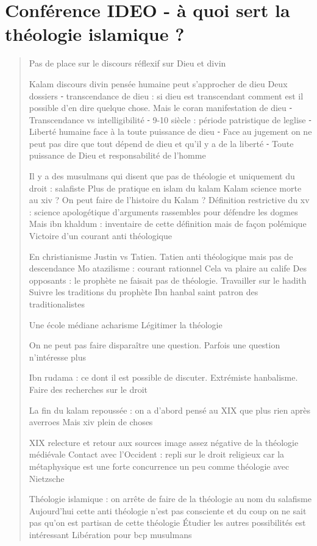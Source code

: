 \section{Conférence IDEO -  à quoi sert la théologie islamique ?}
\begin{quote}

Pas de place sur le discours réflexif sur Dieu et divin
 
Kalam discours divin pensée humaine peut s’approcher de dieu
Deux dossiers
	⁃	transcendance de dieu : si dieu est transcendant comment est il possible d’en dire quelque chose. Mais le coran manifestation de dieu
	⁃	Transcendance vs intelligibilité 
	⁃	9-10 siècle : période patristique de leglise
	⁃	Liberté humaine face à la toute puissance de dieu
	⁃	Face au jugement on ne peut pas dire que tout dépend de dieu et qu’il y a de la liberté 
	⁃	Toute puissance de Dieu et responsabilité de l’homme

Il y a des musulmans qui disent que pas de théologie et uniquement du droit : salafiste
Plus de pratique en islam du kalam
Kalam science morte au xiv ? On peut faire de l’histoire du Kalam ?
Définition restrictive du xv : science apologétique d’arguments rassembles pour défendre les dogmes
Mais ibn khaldum : inventaire de cette définition mais de façon polémique 
Victoire d’un courant anti théologique

En christianisme Justin vs Tatien. Tatien anti théologique mais pas de descendance
Mo atazilisme : courant rationnel
Cela va plaire au calife
Des opposants : le prophète ne faisait pas de théologie. Travailler sur le hadith 
Suivre les traditions du prophète
Ibn hanbal saint patron des traditionalistes

Une école médiane acharisme 
Légitimer la théologie

On ne peut pas faire disparaître une question. Parfois une question n’intéresse plus

Ibn rudama : ce dont il est possible de discuter. Extrémiste hanbalisme. Faire des recherches sur le droit

La fin du kalam repoussée : on a d’abord pensé au XIX que plus rien après averroes 
Mais xiv plein de choses

XIX relecture et retour aux sources image assez négative de la théologie médiévale
Contact avec l’Occident : repli sur le droit religieux car la métaphysique est une forte concurrence un peu comme théologie avec Nietzsche

Théologie islamique : on arrête de faire de la théologie au nom du salafisme
Aujourd’hui cette anti théologie n’est pas consciente et du coup on ne sait pas qu’on est partisan de cette théologie
Étudier les autres possibilités est intéressant
Libération pour bcp musulmans


\end{quote}
